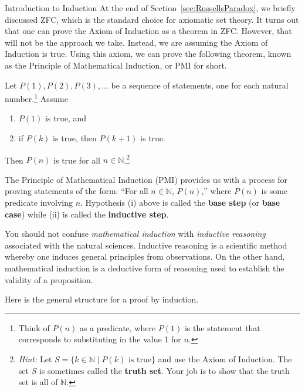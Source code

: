 \begin{section}{Introduction to Induction}
At the end of Section~\ref{sec:RussellsParadox}, we briefly discussed ZFC, which is the standard choice for axiomatic set theory. It turns out that one can prove the Axiom of Induction as a theorem in ZFC.  However, that will not be the approach we take.  Instead, we are assuming the Axiom of Induction is true. Using this axiom, we can prove the following theorem, known as the Principle of Mathematical Induction, or PMI for short.  

\begin{theorem}\label{thm:PMI}
Let $P(1), P(2), P(3), \ldots$ be a sequence of statements, one for each natural number.\footnote{Think of $P(n)$ as a predicate, where $P(1)$ is the statement that corresponds to substituting in the value 1 for $n$.} Assume
\begin{enumerate}[label=\textrm{(\roman*)}]
\item $P(1)$ is true, and
\item if $P(k)$ is true, then $P(k+1)$ is true.
\end{enumerate}
Then $P(n)$ is true for all $n\in\mathbb{N}$.\footnote{\emph{Hint:} Let $S=\{k\in \mathbb{N}\mid P(k) \text{ is true}\}$ and use the Axiom of Induction.  The set $S$ is sometimes called the \textbf{truth set}.  Your job is to show that the truth set is all of $\mathbb{N}$.}
\end{theorem}

The Principle of Mathematical Induction (PMI) provides us with a process for proving statements of the form: ``For all $n\in\mathbb{N}$, $P(n)$,'' where $P(n)$ is some predicate involving $n$.  Hypothesis (i) above is called the \textbf{base step} (or \textbf{base case}) while (ii) is called the \textbf{inductive step}.

You should not confuse \emph{mathematical induction} with \emph{inductive reasoning} associated with the natural sciences. Inductive reasoning is a scientific method whereby one induces general principles from observations. On the other hand, mathematical induction is a deductive form of reasoning used to establish the validity of a proposition.

\begin{skeleton}
Here is the general structure for a proof by induction.

\begin{center}
\end{center}
\end{skeleton}
\end{section}
